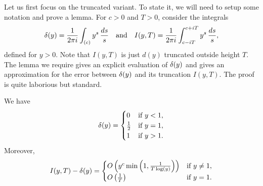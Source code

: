     Let us first focus on the truncated variant. To state it, we will need to setup some notation and prove a lemma. For \(c > 0\) and \(T > 0\), consider the integrals
    \[
      \delta(y) = \frac{1}{2\pi i}\int_{(c)}y^{s}\,\frac{ds}{s} \quad \text{and} \quad I(y,T) = \frac{1}{2\pi i}\int_{c-iT}^{c+iT}y^{s}\,\frac{ds}{s},
    \]
    defined for \(y > 0\). Note that \(I(y,T)\) is just \(d(y)\) truncated outside height \(T\). The lemma we require gives an explicit evaluation of \(\delta(y)\) and gives an approximation for the error between \(\delta(y)\) and its truncation \(I(y,T)\). The proof is quite laborious but standard.

    \begin{lemma}\label{lem:delta_truncation_estimate}
      We have
      \[
        \delta(y) = \begin{cases} 0 & \text{if \(y < 1\)}, \\ \frac{1}{2} & \text{if \(y = 1\)}, \\ 1 & \text{if \(y > 1\)}. \end{cases}
      \]
      Moreover,
      \[
        I(y,T)-\delta(y) = \begin{cases} O\left(y^{c}\min\left(1,\frac{1}{T\log(y)}\right)\right) & \text{if \(y \neq 1\)}, \\ O\left(\frac{1}{T}\right) & \text{if \(y = 1\)}. \end{cases}
      \]
    \end{lemma}
